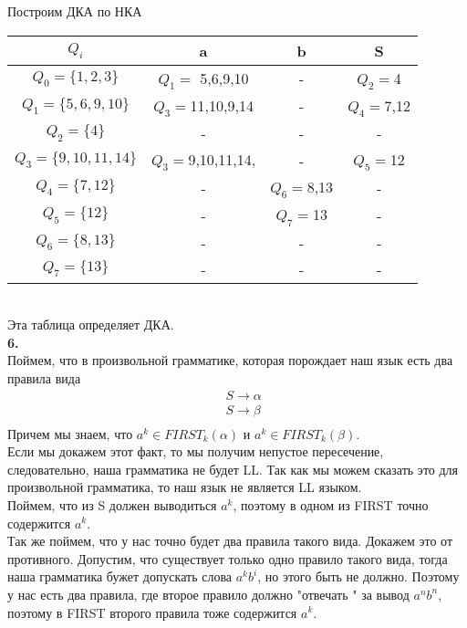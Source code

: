 \documentclass[a4paper,12pt]{article}
\begin{document}
Построим ДКА по НКА\\
\begin{tabular}{  || c | c |c |c || }
\hline
$Q_i$ & a& b& S  \\ \hline
$Q_0=\lbrace 1,2,3\rbrace$ &$Q_1=$ 5,6,9,10& -&$Q_2=$4 \\ \hline
$Q_1=\lbrace 5,6,9,10\rbrace$ & $Q_3=$11,10,9,14& -& $Q_4=$7,12  \\ \hline
$Q_2=\lbrace 4\rbrace$ & -& -& -  \\ \hline
$Q_3=\lbrace 9,10,11,14\rbrace$ & $Q_3=$9,10,11,14,& -& $Q_5=$12  \\ \hline
$Q_4=\lbrace 7,12\rbrace$ & -& $Q_6=$8,13& -  \\ \hline
$Q_5=\lbrace 12\rbrace$ & -& $Q_7=$13& -  \\ \hline
$Q_6=\lbrace 8,13\rbrace$ & -& -& -  \\ \hline
$Q_7=\lbrace 13\rbrace$ & -& -& -  \\ \hline


\hline
\end{tabular}\\ 
Эта таблица определяет ДКА.\\
\textbf{6.}\\
Поймем, что в произвольной грамматике, которая порождает наш язык есть два правила вида \\
\begin{align*}
	&S\to \alpha\\\
	&S\to \beta\\\
\end{align*}
Причем мы знаем, что $a^k \in FIRST_k(\alpha)$ и $a^k \in FIRST_k(\beta)$.\\
Если мы докажем этот факт, то мы получим непустое пересечение, следовательно, наша грамматика не будет LL. Так как мы можем сказать это для произвольной грамматика, то наш язык не является LL языком.\\
Поймем, что из S должен выводиться $a^k$, поэтому в одном из FIRST точно содержится  $a^k$. \\
Так же поймем, что у нас точно будет два правила такого вида. Докажем это от противного. Допустим, что существует только одно правило такого вида, тогда наша грамматика бужет допускать слова $a^kb^i$, но этого быть не должно. 
Поэтому у нас есть два правила, где второе правило должно "отвечать " за вывод $a^nb^n$, поэтому в FIRST второго правила тоже содержится $a^k$.\\
\end{document}
